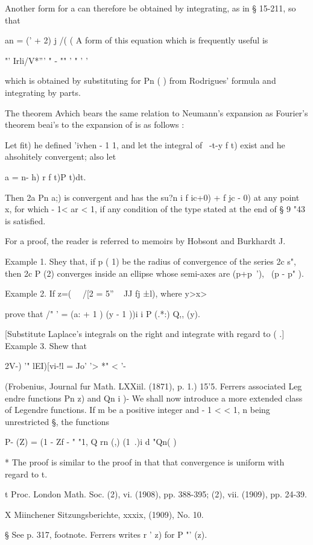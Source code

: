{{{Another form for a can therefore be obtained by integrating, as in §
15-211, so that

an = (' + 2) j /( (  A form of this equation which is frequently
useful is

"' Irli/V*''' " - "" ' " ' '

which is obtained by substituting for Pn ( ) from Rodrigues' formula
and integrating by parts.

The theorem Avhich bears the same relation to Neumann's expansion as
Fourier's theorem beai's to the expansion of is as follows :

Let fit) he defined 'ivhen - 1 1, and let the integral of \ -t-y f t)
exist and he ahsohitely convergent; also let

a = n- h) r f t)P t)dt.

Then 2a Pn a;) is convergent and has the su?n i f ic+0) + f jc - 0) at
any point x, for which - 1< ar < 1, if any condition of the type
stated at the end of § 9 "43 is satisfied.

For a proof, the reader is referred to memoirs by Hobsont and
Burkhardt J.

Example 1. Shey that, if p ( 1) be the radius of convergence of the
series 2c s", then 2c P (2) converges inside an ellipse whose
semi-axes are (p+p~'), \ (p - p" ).

Example 2. If z=( \ \ /[2 = 5'' ~ JJ fj ±l), where y>x>\,

prove that /" ' = (a: + 1 ) (y - 1 ))i i P (.*:) Q,, (y).

[Substitute Laplace's integrals on the right and integrate with regard
to ( .] Example 3. Shew that

2V-) '" lEI)[vi-!l = Jo' '>  *" < '-

(Frobenius, Journal fur Math. LXXiil. (1871), p. 1.) 15'5. Ferrers
associated Leg endre functions Pn z) and Qn i )- We shall now
introduce a more extended class of Legendre functions. If m be a
positive integer and - 1 < < 1, n being unrestricted §, the functions

P- (Z) = (1 - Zf - " "1, Q rn (,) (1 \,.)i d "Qn( )

* The proof is similar to the proof in that that convergence is
uniform with regard to t.

t Proc. London Math. Soc. (2), vi. (1908), pp. 388-395; (2), vii.
(1909), pp. 24-39.

X Miinchener Sitzungsberichte, xxxix, (1909), No. 10.

§ See p. 317, footnote. Ferrers writes r ' z) for P "' (z).

}}}

